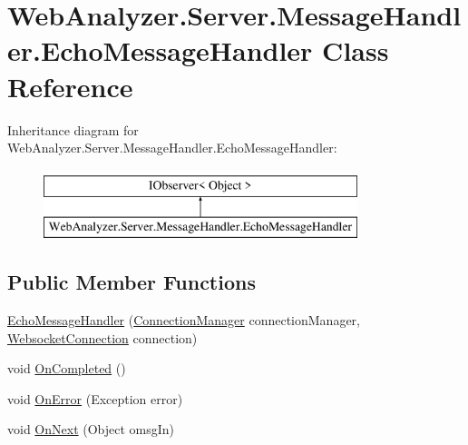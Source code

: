 \hypertarget{class_web_analyzer_1_1_server_1_1_message_handler_1_1_echo_message_handler}{}\section{Web\+Analyzer.\+Server.\+Message\+Handler.\+Echo\+Message\+Handler Class Reference}
\label{class_web_analyzer_1_1_server_1_1_message_handler_1_1_echo_message_handler}
Inheritance diagram for Web\+Analyzer.\+Server.\+Message\+Handler.\+Echo\+Message\+Handler\+:\begin{figure}[H]
\begin{center}
\leavevmode
\includegraphics[height=2.000000cm]{class_web_analyzer_1_1_server_1_1_message_handler_1_1_echo_message_handler}
\end{center}
\end{figure}
\subsection*{Public Member Functions}
\begin{DoxyCompactItemize}
\item 
\hyperlink{class_web_analyzer_1_1_server_1_1_message_handler_1_1_echo_message_handler_a24fde9b6bc5b7849cada3d74e378ce5c}{Echo\+Message\+Handler} (\hyperlink{class_web_analyzer_1_1_server_1_1_connection_manager}{Connection\+Manager} connection\+Manager, \hyperlink{class_web_analyzer_1_1_server_1_1_websocket_connection}{Websocket\+Connection} connection)
\item 
void \hyperlink{class_web_analyzer_1_1_server_1_1_message_handler_1_1_echo_message_handler_a3c39add69c1acce076c0b6b664e6f245}{On\+Completed} ()
\item 
void \hyperlink{class_web_analyzer_1_1_server_1_1_message_handler_1_1_echo_message_handler_a840f12fc2e829ddb44d22de6241cf2eb}{On\+Error} (Exception error)
\item 
void \hyperlink{class_web_analyzer_1_1_server_1_1_message_handler_1_1_echo_message_handler_a8e6f8c41a28dad12b96e8df754c87d4e}{On\+Next} (Object omsg\+In)
\end{DoxyCompactItemize}
